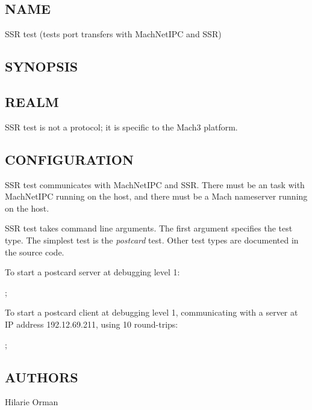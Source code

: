 %
%
%

\subsection*{NAME}

\noindent SSR test (tests port transfers with MachNetIPC and SSR)

\subsection*{SYNOPSIS}

\noindent 

\subsection*{REALM}

SSR test is not a protocol; it is specific to the Mach3 platform.

\subsection*{CONFIGURATION}

SSR test communicates with MachNetIPC and SSR.  There must be an \xk{}
task with MachNetIPC running on the host, and there must be a 
Mach nameserver running on the host.

SSR test takes command line arguments.  The first argument specifies
the test type.  The simplest test is the {\em postcard} test.  Other
test types are documented in the source code.

To start a postcard server at debugging level 1:

;

To start a postcard client at debugging level 1, communicating with a
server at IP address 192.12.69.211, using 10 round-trips:

;

\subsection*{AUTHORS}

\noindent Hilarie Orman
